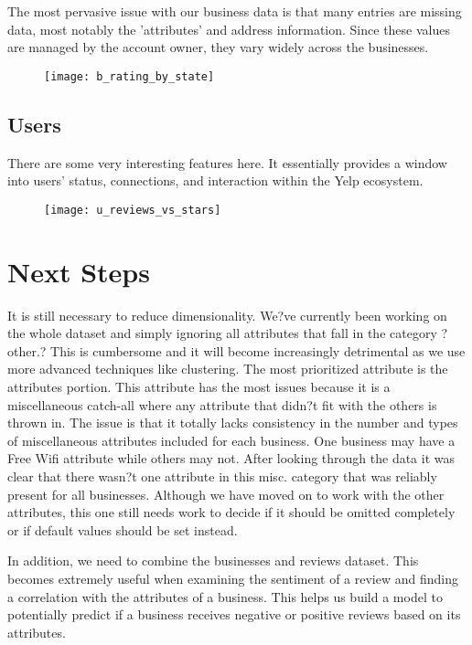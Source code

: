\quad The most pervasive issue with our business data is that many entries are missing data, most notably the 'attributes' and address information. Since these values are managed by the account owner, they vary widely across the businesses.

\begin{figure}[h]
\texttt{[image: b\_rating\_by\_state]}
\end{figure}

\subsection{Users}

\quad There are some very interesting features here. It essentially provides a window into users' status, connections, and interaction within the Yelp ecosystem. 

\begin{figure}[!h]
\texttt{[image: u\_reviews\_vs\_stars]}
\end{figure}

\quad
\section{Next Steps}

\quad It is still necessary to reduce dimensionality. We?ve currently been working on the whole dataset and simply ignoring all attributes that fall in the category ?other.? This is cumbersome and it will become increasingly detrimental as we use more advanced techniques like clustering. The most prioritized attribute is the attributes portion. This attribute has the most issues because it is a miscellaneous catch-all where any attribute that didn?t fit with the others is thrown in. The issue is that it totally lacks consistency in the number and types of miscellaneous attributes included for each business. One business may have a Free Wifi attribute while others may not. After looking through the data it was clear that there wasn?t one attribute in this misc. category that was reliably present for all businesses. Although we have moved on to work with the other attributes, this one still needs work to decide if it should be omitted completely or if default values should be set instead.

\quad In addition, we need to combine the businesses and reviews dataset. This becomes extremely useful when examining the sentiment of a review and finding a correlation with the attributes of a business. This helps us build a model to potentially predict if a business receives negative or positive reviews based on its attributes. 

